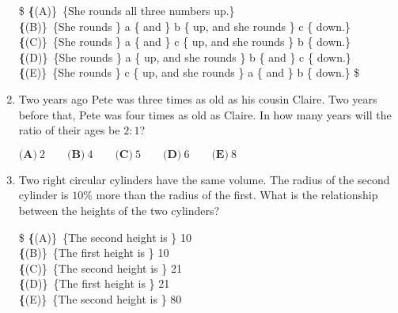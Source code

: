 \documentclass{article}
\begin{document}
\begin{enumerate}[label=\arabic*., itemsep=0.5em]
\$ \textbf\{(A)\}\ \text\{She rounds all three numbers up.\}\\
\qquad\textbf\{(B)\}\ \text\{She rounds \} a \text\{ and \} b \text\{ up, and she rounds \} c \text\{ down.\}\\
\qquad\textbf\{(C)\}\ \text\{She rounds \} a \text\{ and \} c \text\{ up, and she rounds \} b \text\{ down.\} \\
\qquad\textbf\{(D)\}\ \text\{She rounds \} a \text\{ up, and she rounds \} b \text\{ and \} c \text\{ down.\}\\
\qquad\textbf\{(E)\}\ \text\{She rounds \} c \text\{ up, and she rounds \} a \text\{ and \} b \text\{ down.\} \$\par \vspace{0.5em}\item Two years ago Pete was three times as old as his cousin Claire. Two years before that, Pete was four times as old as Claire. In how many years will the ratio of their ages be $2 : 1$?

$ \textbf{(A)}\ 2 \qquad\textbf{(B)}\ 4 \qquad\textbf{(C)}\ 5 \qquad\textbf{(D)}\ 6 \qquad\textbf{(E)}\ 8$\par \vspace{0.5em}\item Two right circular cylinders have the same volume. The radius of the second cylinder is $10\%$ more than the radius of the first. What is the relationship between the heights of the two cylinders?

\$ \textbf\{(A)\}\ \text\{The second height is \} 10\\%
\qquad\textbf\{(B)\}\ \text\{The first height is \} 10\\%
\qquad\textbf\{(C)\}\ \text\{The second height is \} 21\\%
\qquad\textbf\{(D)\}\ \text\{The first height is \} 21\\%
\qquad\textbf\{(E)\}\ \text\{The second height is \} 80\\%


\end{enumerate}
\end{document}
